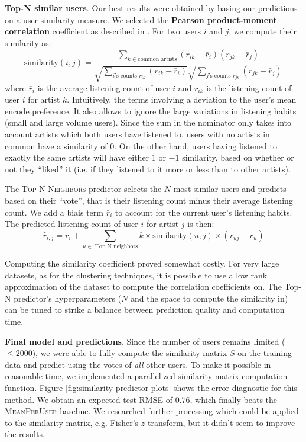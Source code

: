 \documentclass[10pt,a4paper]{article}
\begin{document}
    \noindent
    \textbf{Top-N similar users}. Our best results were obtained by basing our predictions on a user similarity measure. We selected the \textbf{Pearson product-moment correlation} coefficient as described in \cite{cf-techniques-review}. For two users $i$ and $j$, we compute their similarity as:
    \[
      \text{similarity}(i, j) = \frac{
        \sum_{k \in \text{common artists}} (r_{ik} - \bar r_{i})(r_{jk} - \bar r_{j})
      }{
        \sqrt{ \sum_{i\text{'s counts } r_{ik}} (r_{ik} - \bar r_{i}) }
        \sqrt{ \sum_{j\text{'s counts } r_{jk}} (r_{jk} - \bar r_{j}) }
      }
    \]
    where $\bar r_i$ is the average listening count of user $i$ and $r_{ik}$ is the listening count of user $i$ for artist $k$. Intuitively, the terms involving a deviation to the user's mean encode preference. It also allows to ignore the large variations in listening habits (small and large volume users). Since the sum in the nominator only takes into account artists which both users have listened to, users with no artists in common have a similarity of $0$. On the other hand, users having listened to exactly the same artists will have either $1$ or $-1$ similarity, based on whether or not they ``liked'' it (i.e. if they listened to it more or less than to other artists).

    The \textsc{Top-N-Neighbors} predictor selects the $N$ most similar users and predicts based on their ``vote'', that is their listening count minus their average listening count. We add a biais term $\bar r_i$ to account for the current user's listening habits. The predicted listening count of user $i$ for artist $j$ is then:
    \[
      \hat r_{i,j} =
        {\bar r_i} +
        \sum_{u \in \text{~Top N neighbors}}
          k \times \text{similarity}(u, j) \times (r_{uj} - \bar r_{u})
    \]

    Computing the similarity coefficient proved somewhat costly. For very large datasets, as for the clustering techniques, it is possible to use a low rank approximation of the dataset to compute the correlation coefficients on. The Top-N predictor's hyperparameters ($N$ and the space to compute the similarity in) can be tuned to strike a balance between prediction quality and computation time.

    \noindent
    \textbf{Final model and predictions}. Since the number of users remains limited ($\leq 2000$), we were able to fully compute the similarity matrix $S$ on the training data and predict using the votes of \textit{all} other users. To make it possible in reasonable time, we implemented a parallelized similarity matrix computation function. Figure \ref{fig:similarity-predictor-plots} shows the error diagnostic for this method. We obtain an expected test RMSE of $0.76$, which finally beats the \textsc{MeanPerUser} baseline. We researched further processing which could be applied to the similarity matrix, e.g. Fisher's $z$ transform, but it didn't seem to improve the results.
\end{document}
